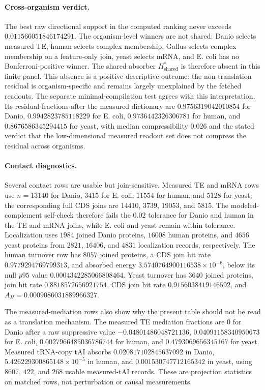 \paragraph{Cross-organism verdict.}
The best raw directional support in the computed ranking never exceeds $0.011566051846174291$.  The organism-level winners are not shared: Danio selects measured TE, human selects complex membership, Gallus selects complex membership on a feature-only join, yeast selects mRNA, and E. coli has no Bonferroni-positive winner.  The shared absorber $H_{\mathrm{shared}}^{\ast}$ is therefore absent in this finite panel.  This absence is a positive descriptive outcome: the non-translation residual is organism-specific and remains largely unexplained by the fetched readouts.  The separate minimal-compilation test agrees with this interpretation.  Its residual fractions after the measured dictionary are $0.9756319042010854$ for Danio, $0.9942823785118229$ for E. coli, $0.9736442326306781$ for human, and $0.8676586345294415$ for yeast, with median compressibility $0.026$ and the stated verdict that the low-dimensional measured readout set does not compress the residual across organisms.

\paragraph{Contact diagnostics.}
Several contact rows are usable but join-sensitive.  Measured TE and mRNA rows use $n=13140$ for Danio, $3415$ for E. coli, $11554$ for human, and $5128$ for yeast; the corresponding full CDS joins are $14410$, $3739$, $19053$, and $5815$.  The modeled-complement self-check therefore fails the $0.02$ tolerance for Danio and human in the TE and mRNA joins, while E. coli and yeast remain within tolerance.  Localization uses $1984$ joined Danio proteins, $16008$ human proteins, and $4656$ yeast proteins from $2821$, $16406$, and $4831$ localization records, respectively.  The human turnover row has $8057$ joined proteins, a CDS join hit rate $0.9779294769799313$, and absorbed energy $3.5740764900116538\times 10^{-6}$, below its null $p95$ value $0.0004342285066808464$.  Yeast turnover has $3640$ joined proteins, join hit rate $0.8818572656921754$, CDS join hit rate $0.9156038419146592$, and $A_H=0.0009086031889966327$.

The measured-mediation rows also show why the present table should not be read as a translation mechanism.  The measured TE mediation fractions are $0$ for Danio after a raw suppressive value $-0.04801486048721136$, $0.04091158340950673$ for E. coli, $0.0027966485036786744$ for human, and $0.4793069656345167$ for yeast.  Measured tRNA-copy tAI absorbs $0.020817102845637092$ in Danio, $5.426229300865148\times 10^{-5}$ in human, and $0.001530747712165342$ in yeast, using $8607$, $422$, and $268$ usable measured-tAI records.  These are projection statistics on matched rows, not perturbation or causal measurements.

